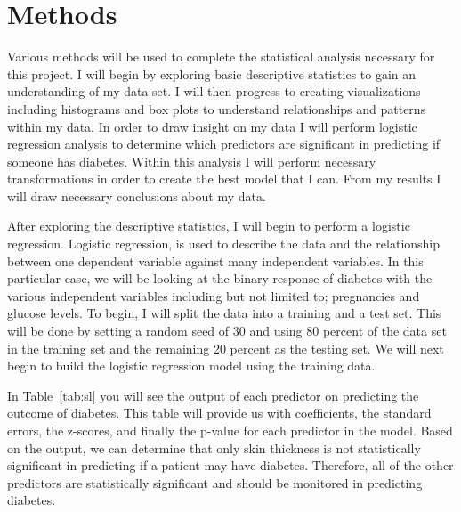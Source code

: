 \documentclass[12pt]{article}
\begin{document}
\section{Methods}
\label{sec:meth}
    Various methods will be used to complete the statistical analysis necessary for this project. I will begin by exploring basic descriptive statistics to gain an understanding of my data set. I will then progress to creating visualizations including histograms and box plots to understand relationships and patterns within my data. In order to draw insight on my data I will perform logistic regression analysis to determine which predictors are significant in predicting if someone has diabetes. Within this analysis I will perform necessary transformations in order to create the best model that I can. From my results I will draw necessary conclusions about my data.
    
    After exploring the descriptive statistics, I will begin to perform a logistic regression. Logistic regression, is used to describe the data and the relationship between one dependent variable against many independent variables. In this particular case, we will be looking at the binary response of diabetes with the various independent variables including but not limited to; pregnancies and glucose levels. To begin, I will split the data into a training and a test set. This will be done by setting a random seed of 30 and using 80 percent of the data set in the training set and the remaining 20 percent as the testing set. We will next begin to build the logistic regression model using the training data. 
    
    In Table~\ref{tab:sl} you will see the output of each predictor on predicting the outcome of diabetes. This table will provide us with coefficients, the standard errors, the z-scores, and finally the p-value for each predictor in the model. Based on the output, we can determine that only skin thickness is not statistically significant in predicting if a patient may have diabetes. Therefore, all of the other predictors are statistically significant and should be monitored in predicting diabetes.
\end{document}
